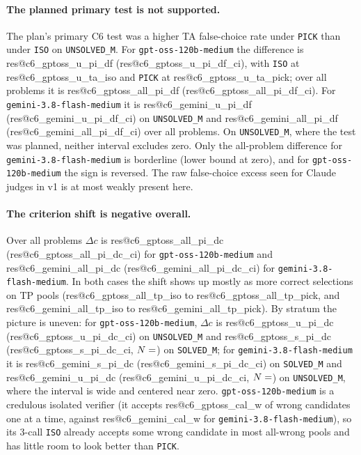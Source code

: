 \documentclass[10pt,twocolumn]{article}
\makeatletter
\newcommand{\res}[1]{\csname res@#1\endcsname}
\makeatother
\begin{document}
\paragraph{The planned primary test is not supported.} The plan's primary C6 test was a higher TA false-choice rate under \texttt{PICK} than under \texttt{ISO} on \texttt{UNSOLVED\_M}. For \texttt{gpt-oss-120b-medium} the difference is \res{c6_gptoss_u_pi_df} (\res{c6_gptoss_u_pi_df_ci}), with \texttt{ISO} at \res{c6_gptoss_u_ta_iso} and \texttt{PICK} at \res{c6_gptoss_u_ta_pick}; over all problems it is \res{c6_gptoss_all_pi_df} (\res{c6_gptoss_all_pi_df_ci}). For \texttt{gemini-3.8-flash-medium} it is \res{c6_gemini_u_pi_df} (\res{c6_gemini_u_pi_df_ci}) on \texttt{UNSOLVED\_M} and \res{c6_gemini_all_pi_df} (\res{c6_gemini_all_pi_df_ci}) over all problems. On \texttt{UNSOLVED\_M}, where the test was planned, neither interval excludes zero. Only the all-problem difference for \texttt{gemini-3.8-flash-medium} is borderline (lower bound at zero), and for \texttt{gpt-oss-120b-medium} the sign is reversed. The raw false-choice excess seen for Claude judges in v1 is at most weakly present here.

\paragraph{The criterion shift is negative overall.} Over all problems $\Delta c$ is \res{c6_gptoss_all_pi_dc} (\res{c6_gptoss_all_pi_dc_ci}) for \texttt{gpt-oss-120b-medium} and \res{c6_gemini_all_pi_dc} (\res{c6_gemini_all_pi_dc_ci}) for \texttt{gemini-3.8-flash-medium}. In both cases the shift shows up mostly as more correct selections on TP pools (\res{c6_gptoss_all_tp_iso} to \res{c6_gptoss_all_tp_pick}, and \res{c6_gemini_all_tp_iso} to \res{c6_gemini_all_tp_pick}). By stratum the picture is uneven: for \texttt{gpt-oss-120b-medium}, $\Delta c$ is \res{c6_gptoss_u_pi_dc} (\res{c6_gptoss_u_pi_dc_ci}) on \texttt{UNSOLVED\_M} and \res{c6_gptoss_s_pi_dc} (\res{c6_gptoss_s_pi_dc_ci}, $N=\res{c6_gptoss_s_pi_n}$) on \texttt{SOLVED\_M}; for \texttt{gemini-3.8-flash-medium} it is \res{c6_gemini_s_pi_dc} (\res{c6_gemini_s_pi_dc_ci}) on \texttt{SOLVED\_M} and \res{c6_gemini_u_pi_dc} (\res{c6_gemini_u_pi_dc_ci}, $N=\res{c6_gemini_u_pi_n}$) on \texttt{UNSOLVED\_M}, where the interval is wide and centered near zero. \texttt{gpt-oss-120b-medium} is a credulous isolated verifier (it accepts \res{c6_gptoss_cal_w} of wrong candidates one at a time, against \res{c6_gemini_cal_w} for \texttt{gemini-3.8-flash-medium}), so its 3-call \texttt{ISO} already accepts some wrong candidate in most all-wrong pools and has little room to look better than \texttt{PICK}.
\end{document}
